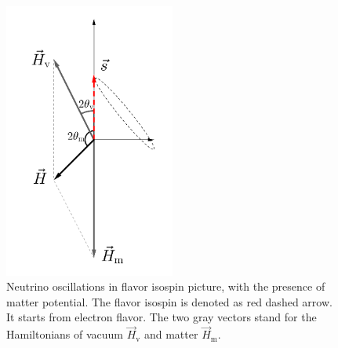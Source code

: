 \begin{figure}[htbp]
    \centering
    \includegraphics[width=0.5\textwidth]{chapters/assets/basics/matter-effect-notsolarge-density}
    \caption{Neutrino oscillations in flavor isospin picture, with the presence of matter potential. The flavor isospin is denoted as red dashed arrow. It starts from electron flavor. The two gray vectors stand for the Hamiltonians of vacuum $\vec H_{\mathrm v}$ and matter $\vec H_{\mathrm m}$.}
    \label{chap:basics-sec:flavor-isospin-pic-fig:matter-effect-notsolarge-density}
\end{figure}




